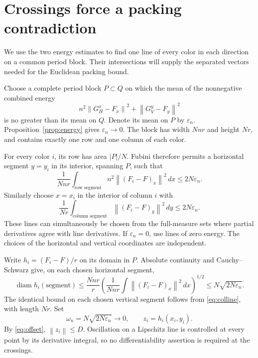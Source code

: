 \documentclass[11pt]{article}
\newcommand{\norm}[1]{\left\lVert#1\right\rVert}
\DeclareMathOperator{\diam}{diam}
\begin{document}
\section{Crossings force a packing contradiction}
\label{sec:crossings}
We use the two energy estimates to find one line of every color in each direction on a common period block. Their intersections will supply the separated vectors needed for the Euclidean packing bound.

Choose a complete period block $P\subset Q$ on which the mean of the nonnegative combined energy
\[
 n^2\norm{G_H^x-F_x}^2+\norm{G_V^y-F_y}^2
\]
is no greater than its mean on $Q$. Denote its mean on $P$ by $\varepsilon_n$. Proposition~\ref{prop:energy} gives $\varepsilon_n\to0$. The block has width $Nnr$ and height $Nr$, and contains exactly one row and one column of each color.

For every color $i$, its row has area $|P|/N$. Fubini therefore permits a horizontal segment $y=y_i$ in its interior, spanning $P$, such that
\begin{equation}\label{eq:rowline}
 \frac{1}{Nnr}\int_{\text{row segment}}
 n^2\norm{(F_i-F)_x}^2\,dx\le2N\varepsilon_n.
\end{equation}
Similarly choose $x=x_i$ in the interior of column $i$ with
\begin{equation}\label{eq:colline}
 \frac{1}{Nr}\int_{\text{column segment}}
 \norm{(F_i-F)_y}^2\,dy\le2N\varepsilon_n.
\end{equation}
These lines can simultaneously be chosen from the full-measure sets where partial derivatives agree with line derivatives. If $\varepsilon_n=0$, use lines of zero energy. The choices of the horizontal and vertical coordinates are independent.

Write $h_i=(F_i-F)/r$ on its domain in $P$. Absolute continuity and Cauchy--Schwarz give, on each chosen horizontal segment,
\[
 \diam h_i(\text{segment})
 \le\frac{Nnr}{r}\left(\frac{1}{Nnr}\int\norm{(F_i-F)_x}^2\,dx\right)^{1/2}
 \le N\sqrt{2N\varepsilon_n}.
\]
The identical bound on each chosen vertical segment follows from \eqref{eq:colline}, with length $Nr$. Set
\begin{equation}\label{eq:omega}
 \omega_n=N\sqrt{2N\varepsilon_n}\longrightarrow0,
 \qquad z_i=h_i(x_i,y_i).
\end{equation}
By \eqref{eq:offset}, $\norm{z_i}\le D$. Oscillation on a Lipschitz line is controlled at every point by its derivative integral, so no differentiability assertion is required at the crossings.
\end{document}
